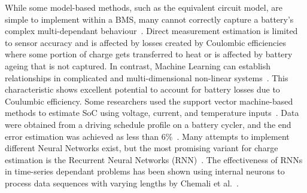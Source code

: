 %
%
While some model-based methods, such as the equivalent circuit model, are simple to implement within a BMS, many cannot correctly capture a battery's complex multi-dependant behaviour~\cite{6953745}.
Direct measurement estimation is limited to sensor accuracy and is affected by losses created by Coulombic efficiencies~\cite{Smith_2010} where some portion of charge gets transferred to heat or is affected by battery ageing that is not captured.
%
In contrast, Machine Learning can establish relationships in complicated and multi-dimensional non-linear systems~\cite{hansen_support_2005,anton_battery_2013,he_state_2014}.
This characteristic shows excellent potential to account for battery losses due to Coulumbic efficiency.
Some researchers used the support vector machine-based methods to estimate SoC using voltage, current, and temperature inputs~\cite{hansen_support_2005,anton_battery_2013}.
Data were obtained from a driving schedule profile on a battery cycler, and the end error estimation was achieved as less than 6\%~\cite{he_state_2014}.
Many attempts to implement different Neural Networks exist, but the most promising variant for charge estimation is the Recurrent Neural Networks (RNN)~\cite{song_lithium-ion_2018, Chemali2017, mamo_long_2020, jiao_gru-rnn_2020, xiao_accurate_2019, javid_adaptive_2020, zhang_deep_2020}.
The effectiveness of RNNs in time-series dependant problems has been shown using internal neurons to process data sequences with varying lengths by Chemali et al.~\cite{Chemali2017}.

